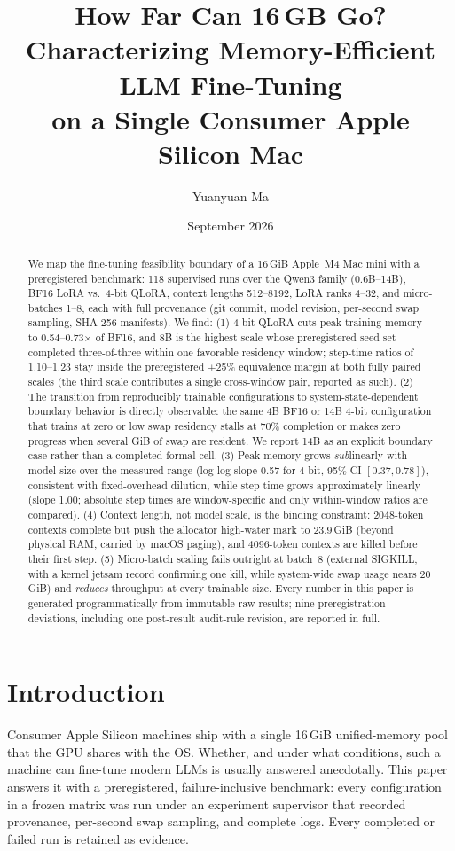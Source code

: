\documentclass[10pt,twocolumn]{article}
\title{How Far Can \texorpdfstring{16\,GB}{16 GB} Go? Characterizing
Memory-Efficient LLM Fine-Tuning\\ on a Single Consumer Apple Silicon Mac}
\author{Yuanyuan Ma}
\date{September 2026}
\begin{document}
\maketitle

\begin{abstract}
We map the fine-tuning feasibility boundary of a 16\,GiB Apple~M4 Mac mini
with a preregistered benchmark: 118 supervised runs over the Qwen3 family
(0.6B--14B), BF16 LoRA vs.\ 4-bit QLoRA, context lengths 512--8192, LoRA
ranks 4--32, and micro-batches 1--8, each with full provenance (git commit,
model revision, per-second swap sampling, SHA-256 manifests). We find:
(1) 4-bit QLoRA cuts peak training memory to 0.54--0.73$\times$ of BF16,
and 8B is the highest scale whose preregistered seed set completed
three-of-three within one favorable residency window; step-time ratios
of 1.10--1.23 stay inside the preregistered $\pm$25\% equivalence margin
at both fully paired scales (the third scale contributes a single
cross-window pair, reported as such). (2) The transition from
reproducibly trainable configurations to system-state-dependent boundary
behavior is directly observable: the same 4B BF16 or 14B 4-bit
configuration that trains at zero or low swap residency stalls at 70\%
completion or makes zero progress when several GiB of swap are resident.
We report 14B as an explicit boundary case rather than a completed
formal cell. (3) Peak memory grows \emph{sub}linearly with model size
over the measured range (log-log slope 0.57 for 4-bit, 95\% CI
$[0.37,0.78]$), consistent with fixed-overhead dilution, while step time
grows approximately linearly (slope 1.00; absolute step times are
window-specific and only within-window ratios are compared). (4) Context
length, not model scale, is the binding constraint: 2048-token contexts
complete but push the allocator high-water mark to 23.9\,GiB (beyond
physical RAM, carried by macOS paging), and 4096-token contexts are
killed before their first step. (5) Micro-batch scaling fails outright
at batch~8 (external SIGKILL, with a kernel jetsam record confirming
one kill, while system-wide swap usage nears 20\,GiB) and \emph{reduces}
throughput at every trainable size. Every number in this paper is
generated programmatically from immutable raw results; nine
preregistration deviations, including one post-result audit-rule
revision, are reported in full.
\end{abstract}

\section{Introduction}
Consumer Apple Silicon machines ship with a single 16\,GiB unified-memory
pool that the GPU shares with the OS. Whether, and under what conditions,
such a machine can fine-tune modern LLMs is usually answered anecdotally.
This paper answers it with a preregistered, failure-inclusive benchmark:
every configuration in a frozen matrix was run under an experiment
supervisor that recorded provenance, per-second swap sampling, and
complete logs. Every completed or failed run is retained as evidence.
\end{document}
